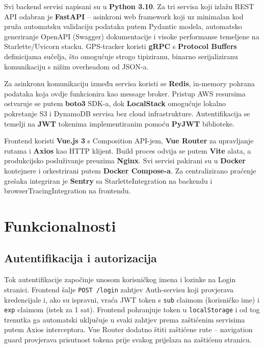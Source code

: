 \documentclass[12pt,a4paper]{article}
\begin{document}
Svi backend servisi napisani su u \textbf{Python 3.10}. Za tri servisa koji izlažu REST API odabran je \textbf{FastAPI} -- asinkroni web framework koji uz minimalan kod pruža automatsku validaciju podataka putem Pydantic modela, automatsko generiranje OpenAPI (Swagger) dokumentacije i visoke performanse temeljene na Starlette/Uvicorn stacku. GPS-tracker koristi \textbf{gRPC} s \textbf{Protocol Buffers} definicijama sučelja, što omogućuje strogo tipiziranu, binarno serijaliziranu komunikaciju s nižim overheadom od JSON-a.

Za asinkronu komunikaciju između servisa koristi se \textbf{Redis}, in-memory pohrana podataka koja ovdje funkcionira kao message broker. Pristup AWS resursima ostvaruje se putem \textbf{boto3} SDK-a, dok \textbf{LocalStack} omogućuje lokalno pokretanje S3 i DynamoDB servisa bez cloud infrastrukture. Autentifikacija se temelji na \textbf{JWT} tokenima implementiranim pomoću \textbf{PyJWT} biblioteke.

Frontend koristi \textbf{Vue.js 3} s Composition API-jem, \textbf{Vue Router} za upravljanje rutama i \textbf{Axios} kao HTTP klijent. Build proces odvija se putem \textbf{Vite} alata, a produkcijsko posluživanje preuzima \textbf{Nginx}. Svi servisi pakirani su u \textbf{Docker} kontejnere i orkestrirani putem \textbf{Docker Compose-a}. Za centralizirano praćenje grešaka integriran je \textbf{Sentry} sa StarletteIntegration na backendu i browserTracingIntegration na frontendu.

\section{Funkcionalnosti}

\subsection{Autentifikacija i autorizacija}

Tok autentifikacije započinje unosom korisničkog imena i lozinke na Login stranici. Frontend šalje \texttt{POST /login} zahtjev Auth-servisu koji provjerava kredencijale i, ako su ispravni, vraća JWT token s \texttt{sub} claimom (korisničko ime) i \texttt{exp} claimom (istek za 1 sat). Frontend pohranjuje token u \texttt{localStorage} i od tog trenutka ga automatski uključuje u svaki zahtjev prema zaštićenim servisima putem Axios interceptora. Vue Router dodatno štiti zaštićene rute -- navigation guard provjerava prisutnost tokena prije svakog prijelaza na zaštićenu stranicu.
\end{document}
